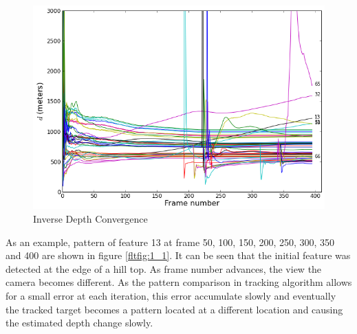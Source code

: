 \begin{figure}[h]
\centering
\includegraphics[width=12cm, keepaspectratio=true]{./Figures/fltfig/cut1/Figure10.png}
\caption{Inverse Depth Convergence}
\label{fltfig:1}
\end{figure}

As an example, pattern of feature 13 at frame 50, 100, 150, 200, 250,
300, 350 and 400 are shown in figure \ref{fltfig:1_1}. It can be seen
that the initial feature was detected at the edge of a hill top. As
frame number advances, the view the camera becomes different. As the
pattern comparison in tracking algorithm allows for a small error at
each iteration, this error accumulate slowly and eventually the
tracked target becomes a pattern located at a different location and
causing the estimated depth change slowly. 

